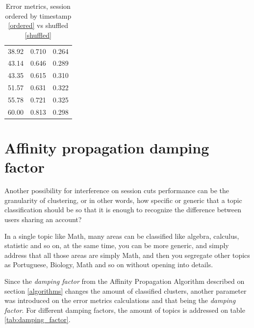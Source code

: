 \documentclass[ecp,tc,english]{iiufrgs}
\begin{document}
\begin{table}[H]
{\begin{tabular}{ |c|c|c| }
                38.92 & 0.710 & 0.264 \\
                43.14 & 0.646 & 0.289 \\
                43.35 & 0.615 & 0.310 \\
                51.57 & 0.631 & 0.322 \\
                55.78 & 0.721 & 0.325 \\
                60.00 & 0.813 & 0.298 \\
                \hline
            \end{tabular}
        }
        \caption{Error metrics, session ordered by timestamp \ref{ordered} vs shuffled \ref{shuffled} }
        \label{tab:cutoff_timestamp_ordered_shuffled}
        \end{table}
    
    \section{Affinity propagation damping factor} \label{affinity_propagation_results}
        Another possibility for interference on session cuts performance can be the granularity of clustering, or in other words, how specific or generic that a topic classification should be so that it is enough to recognize the difference between users sharing an account? 
        
        In a single topic like Math, many areas can be classified like algebra, calculus, statistic and so on, at the same time, you can be more generic, and simply address that all those areas are simply Math, and then you segregate other topics as Portuguese, Biology, Math and so on without opening into details.
        
        Since the \textit{damping factor} from the Affinity Propagation Algorithm described on section \ref{algorithms} changes the amount of classified clusters, another parameter was introduced on the error metrics calculations and that being the \textit{damping factor}. For different damping factors, the amount of topics is addressed on table \ref{tab:damping_factor}.
\end{document}
